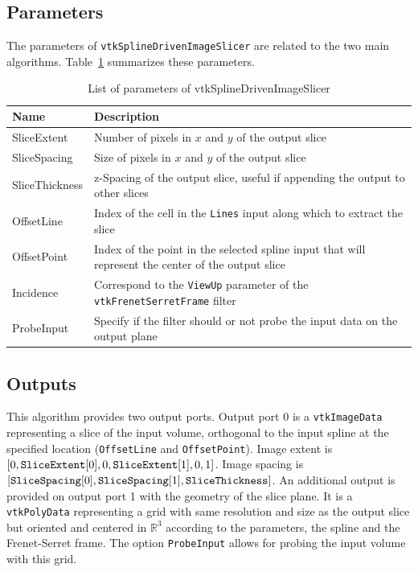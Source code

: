 \documentclass{InsightArticle}
\begin{document}
\subsection{Parameters}
%
The parameters of \verb!vtkSplineDrivenImageSlicer! are related to the two main
algorithms. Table~\ref{tab:parameters} summarizes these parameters.
%
\begin{table}
\centering
 \begin{tabular}{lp{10cm}}
Name & Description \\
\hline
SliceExtent & Number of pixels in $x$ and $y$ of the output slice \\
SliceSpacing & Size of pixels in $x$ and $y$ of the output slice \\
SliceThickness & z-Spacing of the output slice, useful if appending the output to other slices \\
\hline
OffsetLine & Index of the cell in the \verb!Lines! input along which to extract the slice \\
OffsetPoint & Index of the point in the selected spline input that will represent the center of the output slice \\
Incidence & Correspond to the \verb!ViewUp! parameter of the \verb!vtkFrenetSerretFrame! filter \\
\hline
ProbeInput & Specify if the filter should or not probe the input data on the output plane 
 \end{tabular}
\caption{List of parameters of vtkSplineDrivenImageSlicer }
\label{tab:parameters}
\end{table}
%
\subsection{Outputs}
%
This algorithm provides two output ports. Output port 0 is a 
\verb!vtkImageData! representing a slice of the input volume, orthogonal to the
input spline at the specified location (\verb!OffsetLine! and 
\verb!OffsetPoint!). Image 
extent is $[0, \verb!SliceExtent![0], 0, \verb!SliceExtent![1], 0, 1]$. 
Image spacing is 
$[\verb!SliceSpacing![0], \verb!SliceSpacing![1], \verb!SliceThickness!]$. 
An additional output
is provided on output port 1 with the geometry of the slice plane.
It is a \verb!vtkPolyData! representing a grid with same resolution and size as
the output slice but oriented and centered in $\mathbb{R}^3$ according to the 
parameters, the spline and the Frenet-Serret frame. The option 
\verb!ProbeInput! allows for probing the input volume with this grid.
%
\end{document}
